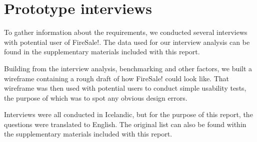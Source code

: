 \section{Prototype interviews}
To gather information about the requirements, we conducted several interviews with potential user of FireSale!. The data used for our interview analysis can be found in the supplementary materials included with this report.

Building from the interview analysis, benchmarking and other factors, we built a wireframe containing a rough draft of how FireSale! could look like. That wireframe was then used with potential users to conduct simple usability tests, the purpose of which was to spot any obvious design errors. 

Interviews were all conducted in Icelandic, but for the purpose of this report, the questions were translated to English. The original list can also be found within the supplementary materials included with this report.
